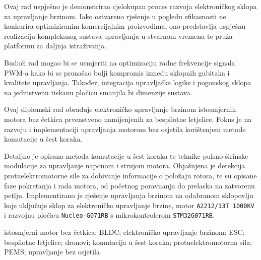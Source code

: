 \documentclass[diplomskirad, upload]{fer}
\begin{document}
Ovaj rad uspješno je demonstrirao cjelokupan proces razvoja elektroničkog
sklopa za upravljanje brzinom. Iako ostvareno rješenje u pogledu efikasnosti ne
konkurira optimiziranim komercijalnim proizvodima, ono predstavlja uspješnu
realizaciju kompleksnog sustava upravljanja u stvarnom vremenu te pruža
platformu za daljnja istraživanja.

Budući rad mogao bi se usmjeriti na optimizaciju radne frekvencije signala
PWM-a kako bi se pronašao bolji kompromis između sklopnih gubitaka i kvalitete
upravljanja. Također, integracija upravljačke logike i pogonskog sklopa na
jedinstvenu tiskanu pločicu smanjila bi dimenzije sustava.





\begin{sazetak}

	Ovaj diplomski rad obrađuje elektroničko upravljanje brzinom istosmjernih
	motora bez četkica prvenstveno namijenjenih za bespilotne letjelice. Fokus je
	na razvoju i implementaciji upravljanja motorom bez osjetila korištenjem metode
	komutacije u šest koraka.

	Detaljno je opisana metoda komutacije u šest koraka te tehnike pulsno-širinske
	modulacije za upravljanje naponom i strujom motora. Objašnjena je detekcija
	protuelektromotorne sile za dobivanje informacije o položaju rotora, te su
	opisane faze pokretanja i rada motora, od početnog poravnanja do prelaska na
	zatvorenu petlju. Implementirano je rješenje upravljanja brzinom na odabranom
	sklopovlju koje uključuje sklop za elektroničko upravljanje brzine, motor
	\texttt{A2212/13T 1000KV} i razvojnu pločicu \texttt{Nucleo-G071RB} s
	mikrokontrolerom \texttt{STM32G071RB}.
\end{sazetak}

\begin{kljucnerijeci}
	istosmjerni motor bez četkica; BLDC; elektroničko upravljanje brzinom; ESC; bespilotne letjelice; dronovi; komutacija u šest koraka; protuelektromotorna sila; PEMS; upravljanje bez osjetila
\end{kljucnerijeci}
\end{document}
